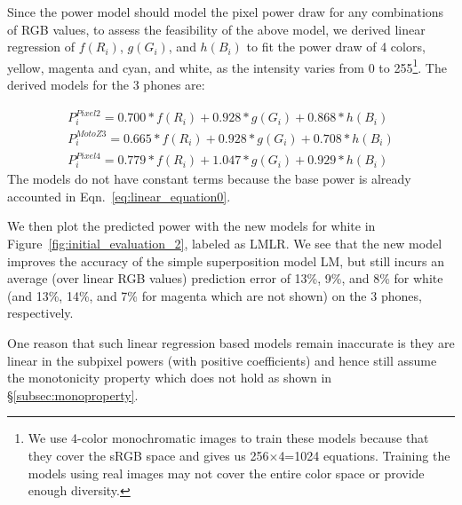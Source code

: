 
Since the power model should model the pixel power draw for
any combinations of RGB values, to assess the feasibility of the above model, we 
derived linear regression of $f(R_{i})$, $g(G_{i})$, and $h(B_{i})$ 
to fit the power draw of 4 colors, yellow, magenta and cyan, and white,
as the intensity varies from 0 to 255\footnote{We use 4-color monochromatic images to train these
  models because that they cover the sRGB space and gives us 256$\times$4=1024 equations.
  Training the models using real images may not cover the entire color space or provide
  enough diversity.}. The derived models
for the 3 phones are:

\vspace{-0.1in}
{\small
  \begin{eqnarray}
	P_i^{Pixel 2} = 0.700*f(R_i) + 0.928*g(G_i) + 0.868*h(B_i) \\
	P_i^{Moto Z3} = 0.665*f(R_i) + 0.928*g(G_i) + 0.708*h(B_i) \\
	P_i^{Pixel 4} = 0.779*f(R_i) + 1.047*g(G_i) + 0.929*h(B_i)
	\label{eq:linear_model_linear_regression}
  \end{eqnarray}
}
\noindent
The models do not have constant terms because the base power is
already accounted in Eqn.~\ref{eq:linear_equation0}.

We then plot the predicted power with the new models for white in
Figure~\ref{fig:initial_evaluation_2}, labeled as LMLR.  We see that the new model
improves the accuracy of the simple superposition model LM, but still
incurs an average (over linear RGB values)
prediction error of 13\%, 9\%, and 8\% for white
(and 13\%, 14\%, and 7\% for magenta which are not shown) on the 3 phones, respectively.

One reason that such linear regression based models remain inaccurate
is they are linear in the subpixel powers (with positive coefficients) and hence still
assume the monotonicity property which does not hold as shown
in \S\ref{subsec:monoproperty}.

